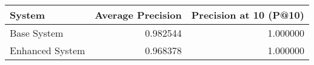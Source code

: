 \begin{tabular}{lrr}
\toprule
System & Average Precision & Precision at 10 (P@10) \\
\midrule
Base System & 0.982544 & 1.000000 \\
Enhanced System & 0.968378 & 1.000000 \\
\bottomrule
\end{tabular}
